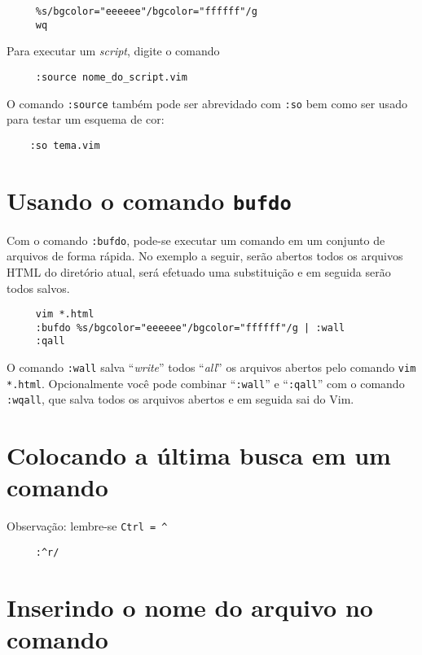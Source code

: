 \begin{verbatim}
     %s/bgcolor="eeeeee"/bgcolor="ffffff"/g
     wq
\end{verbatim}

Para executar um {\em script}, digite o comando

\begin{verbatim}
     :source nome_do_script.vim
\end{verbatim}

O comando {\tt :source} também pode ser abrevidado com {\tt :so}
bem como ser usado para testar um esquema de cor:

\begin{verbatim}
    :so tema.vim
\end{verbatim}

\section{Usando o comando {\tt bufdo}}\label{Usando o comando bufdo}

Com o comando {\tt :bufdo}, pode-se executar um comando em um
conjunto de arquivos de forma rápida. No exemplo a seguir, serão abertos
todos os arquivos HTML do diretório atual, será efetuado uma substituição
e em seguida serão todos salvos.

\begin{verbatim}
     vim *.html
     :bufdo %s/bgcolor="eeeeee"/bgcolor="ffffff"/g | :wall
     :qall
\end{verbatim}

O comando {\tt :wall} salva ``{\em write}'' todos ``{\em all}'' os arquivos
abertos pelo comando {\tt vim *.html}. Opcionalmente você pode
combinar ``{\tt :wall}'' e ``{\tt :qall}'' com o comando {\tt :wqall}, que
salva todos os arquivos abertos e em seguida sai do Vim.

\section{Colocando a última busca em um comando }
Observação: lembre-se \verb|Ctrl = ^|

\begin{verbatim}
     :^r/
\end{verbatim}

\section{Inserindo o nome do arquivo no comando }

